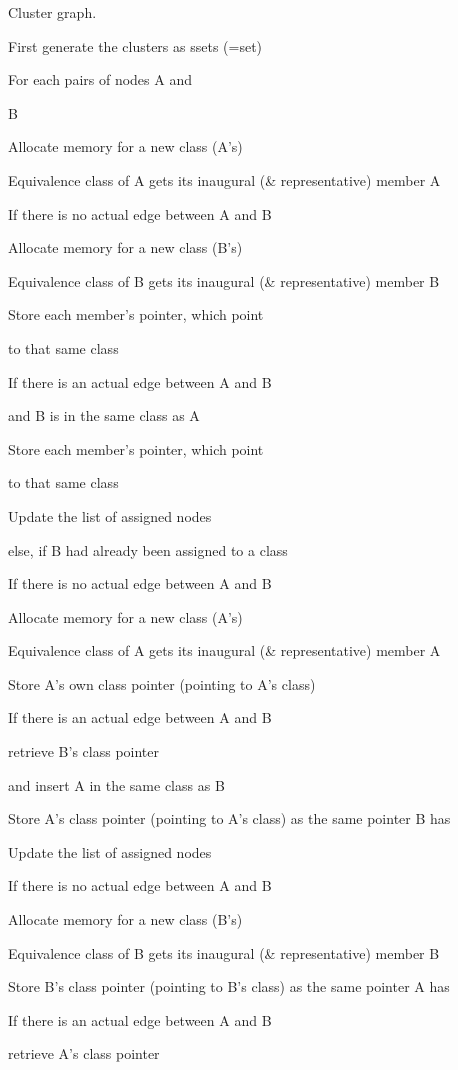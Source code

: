 Cluster graph. 

First generate the clusters as ssets (=set)

For each pairs of nodes A and

B

Allocate memory for a new class (A's)

Equivalence class of A gets its inaugural (\& representative) member A

If there is no actual edge between A and B

Allocate memory for a new class (B's)

Equivalence class of B gets its inaugural (\& representative) member B

Store each member's pointer, which point 

to that same class

If there is an actual edge between A and B

and B is in the same class as A

Store each member's pointer, which point 

to that same class

Update the list of assigned nodes

else, if B had already been assigned to a class

If there is no actual edge between A and B

Allocate memory for a new class (A's)

Equivalence class of A gets its inaugural (\& representative) member A

Store A's own class pointer (pointing to A's class) 

If there is an actual edge between A and B

retrieve B's class pointer

and insert A in the same class as B 

Store A's class pointer (pointing to A's class) as the same pointer B has

Update the list of assigned nodes

If there is no actual edge between A and B

Allocate memory for a new class (B's)

Equivalence class of B gets its inaugural (\& representative) member B

Store B's class pointer (pointing to B's class) as the same pointer A has

If there is an actual edge between A and B

retrieve A's class pointer

